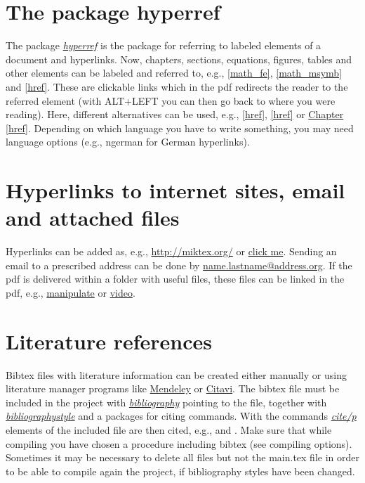 \documentclass[a4paper,11pt,oneside]{book}
\newcommand{\imp}[1]{\underline{\textit{#1}}}
\begin{document}

\section{The package hyperref}

The package \imp{hyperref} is the package for referring to labeled elements of a document and hyperlinks. Now, chapters, sections, equations, figures, tables and other elements can be labeled and referred to, e.g., \autoref{math_fe}, \autoref{math_msymb} and \autoref{href}. These are clickable links which in the pdf redirects the reader to the referred element (with ALT+LEFT you can then go back to where you were reading). Here, different alternatives can be used, e.g., \ref{href}, \autoref{href} or \hyperref[href]{Chapter \ref*{href}}. Depending on which language you have to write something, you may need language options (e.g., ngerman for German hyperlinks).


\section{Hyperlinks to internet sites, email and attached files}

Hyperlinks can be added as, e.g., \url{http://miktex.org/} or \href{http://miktex.org/}{click me}. Sending an email to a prescribed address can be done by \href{mailto:name.lastname@address.org}{name.lastname@address.org}. If the pdf is delivered within a folder with useful files, these files can be linked in the pdf, e.g., \href{run:attachments/manipulate.nb}{manipulate} or \href{run:attachments/video.mp4}{video}.


\section{Literature references}

Bibtex files with literature information can be created either manually or using literature manager programs like \href{http://www.mendeley.com/}{Mendeley} or \href{http://citavi.com/en/index.html}{Citavi}. The bibtex file must be included in the project with \imp{bibliography} pointing to the file, together with \imp{bibliographystyle} and a packages for citing commands. With the commands \imp{cite/p} elements of the included file are then cited, e.g., \cite{Hill1952} and \citep{Kroner1977}. Make sure that while compiling you have chosen a procedure including bibtex (see compiling options). Sometimes it may be necessary to delete all files but not the main.tex file in order to be able to compile again the project, if bibliography styles have been changed.
\end{document}
